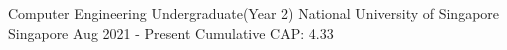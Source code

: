 

\begin{cventries}

	\cventry
	{Computer Engineering Undergraduate(Year 2)}
	{National University of Singapore}
	{Singapore}
	{Aug 2021 - Present}
	{Cumulative CAP: 4.33}

\end{cventries}
